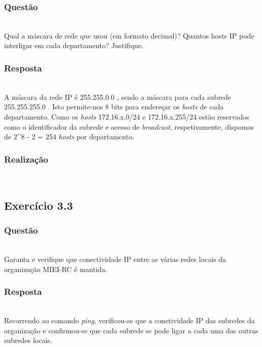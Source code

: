\documentclass{llncs}
\begin{document}
\subsubsection{Questão}\rule[-10pt]{0pt}{10pt}\\

Qual a máscara de rede que usou (em formato decimal)? Quantos hosts IP pode interligar em cada departamento? Justifique.

\subsubsection{Resposta}\rule[-10pt]{0pt}{10pt}\\

A máscara da rede IP é 255.255.0.0 , sendo a máscara para cada subrede 255.255.255.0 . Isto permite-nos 8 bits para endereçar os \textit{hosts} de cada departamento. Como os \textit{hosts} 172.16.x.0/24 e 172.16.x.255/24 estão reservados como o identificador da subrede e acesso de \textit{broadcast}, respetivamente, dispomos de 2\^{}8 - 2 = 254 \textit{hosts} por departamento. 

\subsubsection{Realização}\rule[-10pt]{0pt}{10pt}\\



\subsection{Exercício 3.3}
\subsubsection{Questão}\rule[-10pt]{0pt}{10pt}\\

Garanta e verifique que conectividade IP entre as várias redes locais da organização MIEI-RC é mantida.

\subsubsection{Resposta}\rule[-10pt]{0pt}{10pt}\\

Recorrendo ao comando \textit{ping}, verificou-se que a conetividade IP das subredes da organização e confirmou-se que cada subrede se pode ligar a cada uma das outras subredes locais.
\end{document}
